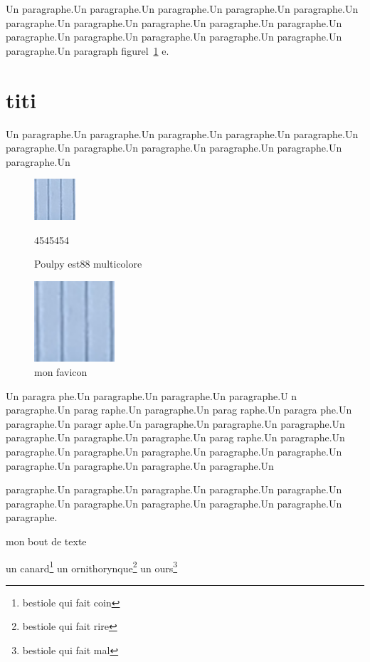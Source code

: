 \documentclass[10pt,twocolumn]{article}
\begin{document}
\begin{doublespace}
Un paragraphe.Un paragraphe.Un paragraphe.Un paragraphe.Un paragraphe.Un paragraphe.Un paragraphe.Un paragraphe.Un paragraphe.Un paragraphe.Un paragraphe.Un paragraphe.Un paragraphe.Un paragraphe.Un paragraphe.Un paragraphe.Un paragraph figurel~\ref{Tux} e.


\section{titi}
Un paragraphe.Un paragraphe.Un paragraphe.Un paragraphe.Un paragraphe.Un paragraphe.Un paragraphe.Un paragraphe.Un paragraphe.Un paragraphe.Un paragraphe.Un 

\begin{figure}[ht]
\begin{center}
\includegraphics{images/favicon.png} 
\caption{Poulpy est88 multicolore}4545454
\label{Tux}
\end{center}
\end{figure}


\begin{figure}
\begin{center}

\includegraphics[width=3cm]{images/favicon.png}
\caption{mon favicon}

\end{center}
\end{figure}

Un paragra phe.Un paragraphe.Un paragraphe.Un paragraphe.U n paragraphe.Un parag raphe.Un paragraphe.Un parag raphe.Un paragra phe.Un paragraphe.Un paragr aphe.Un paragraphe.Un paragraphe.Un paragraphe.Un paragraphe.Un paragraphe.Un paragraphe.Un parag raphe.Un paragraphe.Un paragraphe.Un paragraphe.Un paragraphe.Un paragraphe.Un paragraphe.Un paragraphe.Un paragraphe.Un paragraphe.Un paragraphe.Un 

paragraphe.Un paragraphe.Un paragraphe.Un paragraphe.Un paragraphe.Un paragraphe.Un paragraphe.Un paragraphe.Un paragraphe.Un paragraphe.Un paragraphe.
\end{doublespace}
{\selectfont mon bout de texte}

un canard\footnote{bestiole qui fait coin}
un ornithorynque\footnote{bestiole qui fait rire}
un ours\footnote{bestiole qui fait mal}
\end{document}
